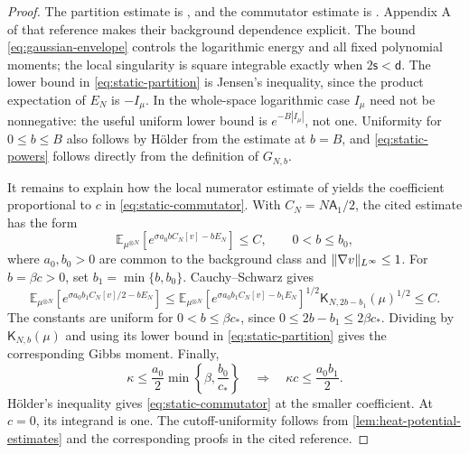 \documentclass[11pt,reqno]{amsart}
\numberwithin{equation}{section}
\theoremstyle{plain}
\theoremstyle{remark}
\DeclarePairedDelimiter{\norm}{\lVert}{\rVert}
\renewcommand{\d}{\mathsf{d}}\newcommand{\s}{\mathsf{s}}
\newcommand{\E}{\mathbb E}\newcommand{\Q}{\mathbb Q}\newcommand{\Pb}{\mathbb P}
\newcommand{\K}{\mathsf K}\newcommand{\g}{\mathsf g}\newcommand{\Fr}{\mathsf F}
\begin{document}
\begin{proof}
The partition estimate is \cite[Theorem 2.2]{DGRpartition}, and the commutator estimate is \cite[Theorem 2.8 and Sections 7.3--7.4]{DGRpartition}. Appendix A of that reference makes their background dependence explicit. The bound \eqref{eq:gaussian-envelope} controls the logarithmic energy and all fixed polynomial moments; the local singularity is square integrable exactly when $2\s<\d$. The lower bound in \eqref{eq:static-partition} is Jensen's inequality, since the product expectation of $E_N$ is $-I_\mu$. In the whole-space logarithmic case $I_\mu$ need not be nonnegative: the useful uniform lower bound is $e^{-B|I_\mu|}$, not one. Uniformity for $0\le b\le B$ also follows by H\"older from the estimate at $b=B$, and \eqref{eq:static-powers} follows directly from the definition of $G_{N,b}$.

It remains to explain how the local numerator estimate of \cite[Lemma~7.2]{DGRpartition} yields the coefficient proportional to $c$ in \eqref{eq:static-commutator}. With $C_N=N\mathsf A_1/2$, the cited estimate has the form
\begin{equation}\label{eq:local-numerator}
 \E_{\mu^{\otimes N}}[e^{\sigma a_0 b C_N[v]-bE_N}]\le C,
                  \qquad 0<b\le b_0,
\end{equation}
where $a_0,b_0>0$ are common to the background class and $\norm{\nabla v}_{L^\infty}\le1$. For $b=\beta c>0$, set $b_1=\min\{b,b_0\}$. Cauchy--Schwarz gives
\begin{equation}\label{eq:commutator-coupling-interpolation}
 \E_{\mu^{\otimes N}}[e^{\sigma a_0b_1C_N[v]/2-bE_N}]
 \le \E_{\mu^{\otimes N}}[e^{\sigma a_0b_1C_N[v]-b_1E_N}]^{1/2}
       \K_{N,2b-b_1}(\mu)^{1/2}\le C.
\end{equation}
The constants are uniform for $0<b\le\beta c_*$, since $0\le2b-b_1\le2\beta c_*$. Dividing by $\K_{N,b}(\mu)$ and using its lower bound in \eqref{eq:static-partition} gives the corresponding Gibbs moment. Finally,
\begin{equation}\label{eq:commutator-coefficient-choice}
 \kappa\le\frac{a_0}{2}\min\left\{\beta,\frac{b_0}{c_*}\right\}
 \quad\Longrightarrow\quad
 \kappa c\le\frac{a_0b_1}{2}.
\end{equation}
H\"older's inequality gives \eqref{eq:static-commutator} at the smaller coefficient. At $c=0$, its integrand is one. The cutoff-uniformity follows from \cref{lem:heat-potential-estimates} and the corresponding proofs in the cited reference.
\end{proof}
\end{document}
